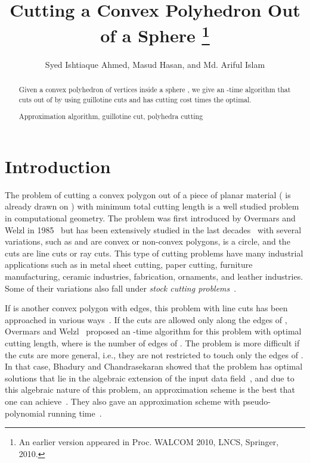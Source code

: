 \documentclass{llncs}
\date{}
\title{Cutting a Convex Polyhedron Out of a Sphere \thanks{An earlier version appeared in Proc. WALCOM 2010, LNCS, Springer, 2010.}}
\author{Syed Ishtiaque Ahmed, Masud Hasan, and Md. Ariful Islam}
\institute{
Department of Computer Science and Engineering\\
Bangladesh University of Engineering and Technology\\
Dhaka-1000, Bangladesh\\
\texttt{http://www.buet.ac.bd/cse}\\ 
\email{\texttt{ishtiaque@csebuet.org, masudhasan@cse.buet.ac.bd, arifulislam@csebuet.org}}
}
\begin{document}
\maketitle{}


\begin{abstract}
Given a convex polyhedron  of  vertices inside a sphere , we give an -time algorithm that cuts  out of 
by using guillotine cuts and has cutting cost  times the optimal.

\smallskip

 Approximation algorithm, guillotine cut, polyhedra cutting
\end{abstract}

\section{Introduction} 

The problem of cutting a convex polygon  out of a piece of planar material  
( is already drawn on )
with minimum total cutting length is a well studied problem in computational geometry.
The problem was first introduced by Overmars and Welzl in 1985~\cite{aa}
but has been extensively studied in the last decades~\cite{AIH,aa,ab,ac,ae,ag,ah,ai,am,JK03}
with several variations, such as  and  are
convex or non-convex polygons,  is a circle, and the cuts are line cuts or ray cuts.
This type of cutting problems have many industrial applications such as in metal sheet cutting, paper cutting,
furniture manufacturing, ceramic industries, fabrication, ornaments, and leather industries.
Some of their variations also fall under \emph{stock cutting problems}~\cite{ab}.

If  is another convex polygon with  edges, this problem with line cuts 
has been approached in various ways~\cite{aa,ab,ac,ad,ae,af,ah,ai}.
If the cuts are allowed only along the edges of ,
Overmars and Welzl~\cite{aa} proposed an -time algorithm for this problem with optimal cutting length,
where  is the number of edges of .
The problem is more difficult if the cuts are more general, i.e.,
they are not restricted to touch only the edges of .
In that case, Bhadury and Chandrasekaran showed that the problem has optimal solutions
that lie in the algebraic extension of the input data field~\cite{ab},
and due to this algebraic nature of this problem,
an approximation scheme
is the best that one can achieve~\cite{ab}.
They also gave an approximation scheme
with pseudo-polynomial running time~\cite{ab}.
\end{document}
